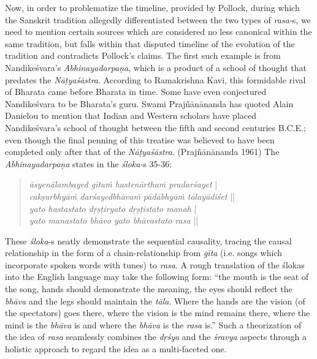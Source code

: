Now, in order to problematize the timeline, provided by Pollock, during which the Sanskrit tradition allegedly differentiated between the two types of \textsl{rasa-}s, we need to mention certain sources which are considered no less canonical within the same tradition, but falls within that disputed timeline of the evolution of the tradition and contradicts Pollock’s claims. The first such example is from Nandikeśvara’s \textsl{Abhinayadarpaṇa}, which is a product of a school of thought that predates the \textsl{Nāṭyaśāstra}. According to Ramakrishna Kavi, this formidable rival of Bharata came before Bharata in time. Some have even conjectured Nandikeśvara to be Bharata’s guru. Swami Prajñānānanda has quoted Alain Danielou to mention that Indian and Western scholars have placed Nandikeśvara’s school of thought between the fifth and second centuries B.C.E.; even though the final penning of this treatise was believed to have been completed only after that of the \textsl{Nāṭyaśāstra}. (Prajñānānanda 1961) The \textsl{Abhinayadarpaṇa} states in the \textsl{śloka-}s 35-36:
\begin{quote}
\textsl{āsyenālambayed gītaṁ hastenārthaṁ pradarśayet} |  \\
\textsl{cakṣurbhyāṁ darśayedbhāvaṁ pādābhyāṁ tālayādiśet} ||   \\
\textsl{yato hastastato dṛṣṭiryato dṛṣṭistato manah} | \\
\textsl{yato manastato bhāvo yato bhāvastato rasa} || 
\end{quote}

These \textsl{śloka}-s neatly demonstrate the sequential causality, tracing the causal relationship in the form of a chain-relationship from \textsl{gīta} (i.e. songs which incorporate spoken words with tunes) to \textsl{rasa}. A rough translation of the ślokas into the English language may take the following form: “the mouth is the seat of the song, hands should demonstrate the meaning, the eyes should reflect the \textsl{bhāva} and the legs should maintain the \textsl{tāla}. Where the hands are the vision (of the spectators) goes there, where the vision is the mind remains there, where the mind is the \textsl{bhāva} is and where the \textsl{bhāva} is the \textsl{rasa} is.” Such a theorization of the idea of \textsl{rasa} seamlessly combines the \textsl{dṛśya} and the \textsl{śravya} aspects through a holistic approach to regard the idea as a multi-faceted one. 

